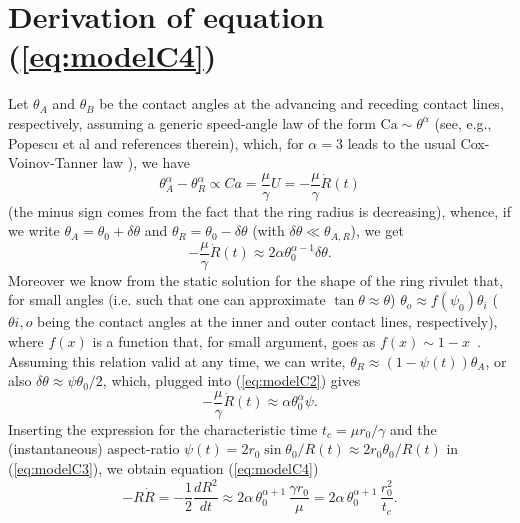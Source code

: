 \documentclass[%
 aip,
 amsmath,amssymb,
 reprint,%
]{revtex4-1}
\begin{document}
\section{Derivation of equation (\ref{eq:modelC4})}\label{sec:derivation}
Let $\theta_A$ and $\theta_B$ be the contact angles at the advancing and receding contact lines, respectively, assuming a generic speed-angle law of the form $\text{Ca} \sim \theta^{\alpha}$ (see, e.g., Popescu et al\cite{Popescu2012} and references therein), which, 
for $\alpha = 3$ leads to the usual Cox-Voinov-Tanner law \cite{SnoeijerARFM2013}), we have
\begin{equation}\label{eq:modelCV}
    \theta_A^{\alpha} - \theta_R^{\alpha} \propto Ca = \frac{\mu}{\gamma} U = - \frac{\mu}{\gamma} \dot{R}(t)
\end{equation}
(the minus sign comes from the fact that the ring radius is decreasing), whence, if we write $\theta_A = \theta_0 + \delta \theta$ and $\theta_R = \theta_0 - \delta \theta$ (with $\delta \theta \ll \theta_{A,R}$), we get
\begin{equation}\label{eq:modelC2}
    - \frac{\mu}{\gamma} \dot{R}(t) \approx 2 \alpha \theta_0^{\alpha-1} \delta \theta.
\end{equation}
Moreover we know from the static solution for the shape of the ring rivulet that, for small angles (i.e. such that one can approximate $\tan \theta \approx \theta$) $\theta_o \approx f(\psi_0) \theta_i$ ($\theta{i,o}$ being the contact angles at the inner and outer contact lines, respectively), where $f(x)$ is a function that, for small argument, goes as $f(x) \sim 1-x$~\cite{gonzalezStabilityLiquidRing2013}.
Assuming this relation valid at any time, we can write, $\theta_R \approx (1-\psi(t))\theta_A$, or also $\delta \theta \approx \psi \theta_0/2$, which, plugged into (\ref{eq:modelC2}) gives
\begin{equation}\label{eq:modelC3}
    - \frac{\mu}{\gamma} \dot{R}(t) \approx \alpha \theta_0^{\alpha} \psi.
\end{equation}
Inserting the expression for the characteristic time $t_c = \mu r_0/\gamma$ and the (instantaneous) aspect-ratio $\psi(t) = 2r_0\sin \theta_0/R(t) \approx 2 r_0\theta_0/R(t)$ in (\ref{eq:modelC3}), 
we obtain equation (\ref{eq:modelC4})
\begin{equation}
    -R\dot{R} = - \frac{1}{2}\frac{d R^2}{d t} \approx 2\alpha\, \theta_0^{\alpha +1} \, \frac{\gamma r_0}{\mu} = 2\alpha \, \theta_0^{\alpha +1} \, \frac{r_0^2}{t_c}.
\end{equation}

\nocite{*}
\end{document}
